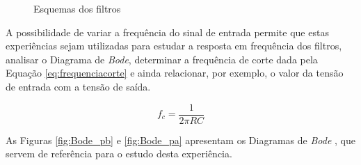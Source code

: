 \begin{figure}[hbtp]
	\centering%
		\centering
		\qquad
		\caption{Esquemas dos filtros \cite{sedrasmith}}%
		\label{fig:filtrosesqgeral}%
\end{figure}

A possibilidade de variar a frequência do sinal de entrada permite que estas experiências sejam utilizadas para estudar a resposta em frequência dos filtros, analisar o Diagrama de \textit{Bode}, determinar a frequência de corte dada pela Equação \ref{eq:frequenciacorte} e ainda relacionar, por exemplo, o valor da tensão de entrada com a tensão de saída. 

\begin{equation} \label{eq:frequenciacorte}
	f_{c} = \frac{1}{2\pi RC}
\end{equation}

As Figuras \ref{fig:Bode_pb} e \ref{fig:Bode_pa} apresentam os Diagramas de \textit{Bode} , que servem de referência para o estudo desta experiência. 

